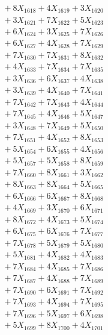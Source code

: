\documentclass[a4paper,10pt]{article}
\begin{document}
{\begin{align}
&\;  + 8 X_{1618} + 4 X_{1619} + 3 X_{1620} \\[0.3ex]
&\;  + 3 X_{1621} + 7 X_{1622} + 5 X_{1623} \\[0.3ex]
&\;  + 6 X_{1624} + 3 X_{1625} + 7 X_{1626} \\[0.3ex]
&\;  + 6 X_{1627} + 4 X_{1628} + 7 X_{1629} \\[0.5ex]\allowbreak
&\;  + 7 X_{1630} + 7 X_{1631} + 8 X_{1632} \\[0.3ex]
&\;  + 4 X_{1633} + 7 X_{1634} + 7 X_{1635} \\[0.3ex]
&\;  + 3 X_{1636} + 6 X_{1637} + 4 X_{1638} \\[0.3ex]
&\;  + 3 X_{1639} + 4 X_{1640} + 7 X_{1641} \\[0.3ex]
&\;  + 7 X_{1642} + 7 X_{1643} + 4 X_{1644} \\[0.3ex]
&\;  + 7 X_{1645} + 4 X_{1646} + 5 X_{1647} \\[0.3ex]
&\;  + 3 X_{1648} + 7 X_{1649} + 5 X_{1650} \\[0.3ex]
&\;  + 7 X_{1651} + 4 X_{1652} + 8 X_{1653} \\[0.3ex]
&\;  + 5 X_{1654} + 6 X_{1655} + 4 X_{1656} \\[0.3ex]
&\;  + 5 X_{1657} + 5 X_{1658} + 8 X_{1659} \\[0.5ex]\allowbreak
&\;  + 7 X_{1660} + 8 X_{1661} + 3 X_{1662} \\[0.3ex]
&\;  + 8 X_{1663} + 8 X_{1664} + 5 X_{1665} \\[0.3ex]
&\;  + 6 X_{1666} + 6 X_{1667} + 8 X_{1668} \\[0.3ex]
&\;  + 4 X_{1669} + 3 X_{1670} + 6 X_{1671} \\[0.3ex]
&\;  + 8 X_{1672} + 4 X_{1673} + 5 X_{1674} \\[0.3ex]
&\;  + 6 X_{1675} + 6 X_{1676} + 7 X_{1677} \\[0.3ex]
&\;  + 7 X_{1678} + 5 X_{1679} + 5 X_{1680} \\[0.3ex]
&\;  + 5 X_{1681} + 4 X_{1682} + 4 X_{1683} \\[0.3ex]
&\;  + 7 X_{1684} + 4 X_{1685} + 7 X_{1686} \\[0.3ex]
&\;  + 7 X_{1687} + 4 X_{1688} + 7 X_{1689} \\[0.5ex]\allowbreak
&\;  + 7 X_{1690} + 6 X_{1691} + 7 X_{1692} \\[0.3ex]
&\;  + 7 X_{1693} + 4 X_{1694} + 7 X_{1695} \\[0.3ex]
&\;  + 7 X_{1696} + 5 X_{1697} + 6 X_{1698} \\[0.3ex]
&\;  + 5 X_{1699} + 8 X_{1700} + 4 X_{1701} \\[0.3ex]

\end{align}}
\end{document}
